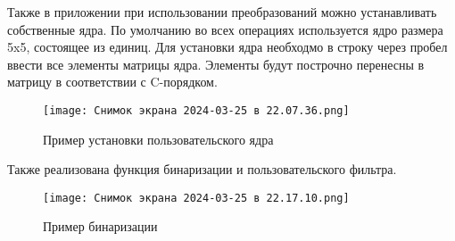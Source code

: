 \documentclass{article}
\begin{document}
Также в приложении при использовании преобразований можно устанавливать собственные ядра. По умолчанию во всех операциях используется ядро размера 5x5, состоящее из единиц. Для установки ядра необходмо в строку через пробел ввести все элементы матрицы ядра. Элементы будут построчно перенесны в матрицу в соответствии с C-порядком.

\begin{figure}[h!]
    \centering
    \texttt{[image: Снимок экрана 2024-03-25 в 22.07.36.png]}
    \caption{Пример установки пользовательского ядра}
    \label{fig:enter-label}
\end{figure}

Также реализована функция бинаризации и пользовательского фильтра.

\begin{figure}[h!]
    \centering
    \texttt{[image: Снимок экрана 2024-03-25 в 22.17.10.png]}
    \caption{Пример бинаризации}
    \label{fig:enter-label}
\end{figure}
\end{document}
